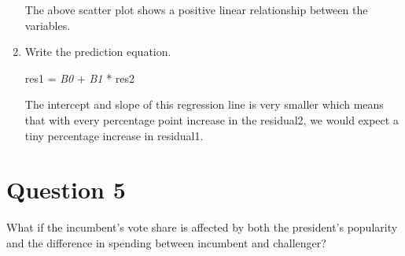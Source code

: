 \documentclass[12pt,letterpaper]{article}
\begin{document}
\begin{enumerate}
\begin{figure}[h!]
		\end{figure}
		
		The above scatter plot shows a positive linear relationship between the variables.
		
		
		\item Write the prediction equation.
	
	
	res1 = \textit{B0} + \textit{B1} * res2
	
	
	The intercept and slope of this regression line is very smaller which means that with every percentage point increase in the residual2, we would expect a tiny percentage increase in residual1.
	
	\end{enumerate}
	
	\newpage	

\section*{Question 5}
\noindent What if the incumbent's vote share is affected by both the president's popularity and the difference in spending between incumbent and challenger? 
\end{document}
